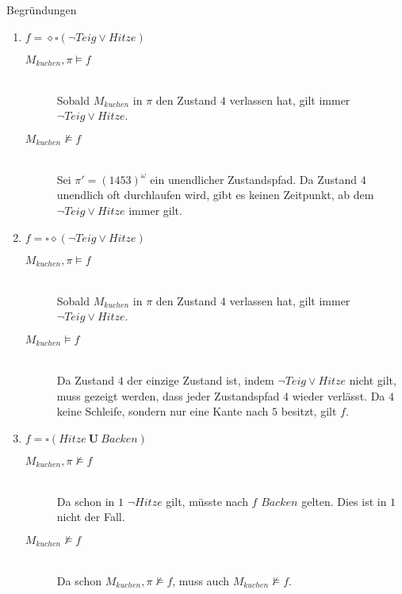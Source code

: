 \documentclass[a4paper]{scrartcl}
\begin{document}
Begründungen
\begin{enumerate}
    \item $f = \diamond\square(\lnot Teig \lor Hitze)$
        \begin{description}
            \item[$M_{kuchen}, \pi \models f$] \hfill \\
                Sobald $M_{kuchen}$ in $\pi$ den Zustand $4$ verlassen hat,
                gilt immer $\lnot Teig \lor Hitze$.

            \item[$M_{kuchen} \not\models f$] \hfill \\
                Sei $\pi' = (1453)^\omega$ ein unendlicher Zustandspfad.
                Da Zustand $4$ unendlich oft durchlaufen wird, gibt es keinen
                Zeitpunkt, ab dem $\lnot Teig \lor Hitze$ immer gilt.

        \end{description}

    \item $f = \square\diamond(\lnot Teig \lor Hitze)$
        \begin{description}
            \item[$M_{kuchen}, \pi \models f$] \hfill \\
                Sobald $M_{kuchen}$ in $\pi$ den Zustand $4$ verlassen hat,
                gilt immer $\lnot Teig \lor Hitze$.

            \item[$M_{kuchen} \models f$] \hfill \\
                Da Zustand $4$ der einzige Zustand ist, indem
                $\lnot Teig \lor Hitze$ nicht gilt, muss gezeigt werden, dass
                jeder Zustandspfad $4$ wieder verlässt.
                Da $4$ keine Schleife, sondern nur eine Kante nach $5$ besitzt,
                gilt $f$.

        \end{description}

    \item $f = \square(Hitze ~\textbf{U}~ Backen)$
        \begin{description}
            \item[$M_{kuchen}, \pi \not\models f$] \hfill \\
                Da schon in $1$ $\lnot Hitze$ gilt, müsste nach $f$ $Backen$
                gelten.
                Dies ist in $1$ nicht der Fall.

            \item[$M_{kuchen} \not\models f$] \hfill \\
                Da schon $M_{kuchen}, \pi \not\models f$, muss auch
                $M_{kuchen} \not\models f$.


\end{description}
\end{enumerate}
\end{document}
